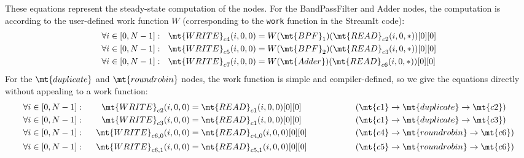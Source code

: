 These equations represent the steady-state computation of the nodes.
For the BandPassFilter and Adder nodes, the computation is according
to the user-defined work function $W$ (corresponding to the {\tt work}
function in the StreamIt code):
\begin{align*}
\forall i \in [0, N-1]:~~\mt{WRITE}_{c4}(i,0,0) &= W(\mt{BPF}_1)(\mt{READ}_{c2}(i, 0, *))[0][0] \\
\forall i \in [0, N-1]:~~\mt{WRITE}_{c5}(i,0,0) &= W(\mt{BPF}_2)(\mt{READ}_{c3}(i, 0, *))[0][0] \\
\forall i \in [0, N-1]:~~\mt{WRITE}_{c7}(i,0,0) &= W(\mt{Adder})(\mt{READ}_{c6}(i, 0, *))[0][0]
\end{align*}
For the $\mt{duplicate}$ and $\mt{roundrobin}$ nodes, the work
function is simple and compiler-defined, so we give the equations
directly without appealing to a work function:
\begin{align*}
\forall i \in [0, N-1]:&& ~~\mt{WRITE}_{c2}(i,0,0) &= \mt{READ}_{c1}(i, 0, 0)[0][0] &&~~~~~~~~~~~~~~ (\mt{c1} \rightarrow \mt{duplicate} \rightarrow \mt{c2}) \\
\forall i \in [0, N-1]:&& ~~\mt{WRITE}_{c3}(i,0,0) &= \mt{READ}_{c1}(i, 0, 0)[0][0] &&~~~~~~~~~~~~~~ (\mt{c1} \rightarrow \mt{duplicate} \rightarrow \mt{c3}) \\
\forall i \in [0, N-1]:&& ~~\mt{WRITE}_{{c6}, 0}(i,0,0) &= \mt{READ}_{{c4}, 0}(i, 0, 0)[0][0]  &&~~~~~~~~~~~~~~ (\mt{c4} \rightarrow \mt{roundrobin} \rightarrow \mt{c6}) \\
\forall i \in [0, N-1]:&& ~~\mt{WRITE}_{{c6}, 1}(i,0,0) &= \mt{READ}_{{c5}, 1}(i, 0, 0)[0][0] &&~~~~~~~~~~~~~~ (\mt{c5} \rightarrow \mt{roundrobin} \rightarrow \mt{c6}) 
\end{align*}


